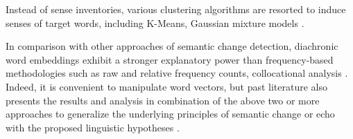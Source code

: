 
Instead of sense inventories, various clustering algorithms are resorted to induce senses of target words, including K-Means, Gaussian mixture models \parencite{giulianelli2019lexical}.

In comparison with other approaches of semantic change detection, diachronic word embeddings exhibit a stronger explanatory power than frequency-based methodologies such as raw and relative frequency counts, collocational analysis \parencite{kutuzov2018survey}. Indeed, it is convenient to manipulate word vectors, but past literature also presents the results and analysis in combination of the above two or more approaches to generalize the underlying principles of semantic change or echo with the proposed linguistic hypotheses \parencite{tahmasebi2018survey}.%

